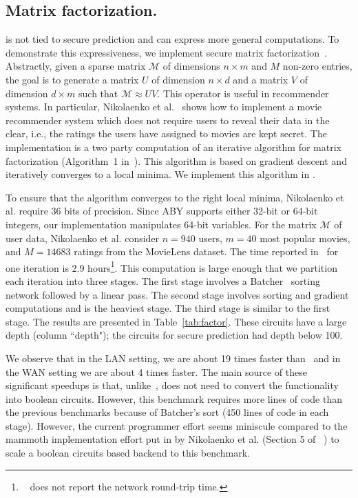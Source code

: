 \subsection{Matrix factorization.}
\tool is not tied to secure prediction and can express more general computations.
To demonstrate this expressiveness, we  implement secure matrix factorization~\cite{valeriaMatrix}. Abstractly, given a sparse matrix $\mathcal{M}$ of dimensions
$n\times m$ and $M$ non-zero entries, the goal is to generate a matrix $U$ of dimension $n\times d$ and a matrix
$V$ of dimension $d\times m$ such that $\mathcal{M}\approx UV$. This operator is useful in recommender systems.
In particular, Nikolaenko et al.~\cite{valeriaMatrix} shows how to implement a movie recommender system which does not require users to reveal their data in the clear, i.e., the ratings the users have assigned to movies are kept secret. The implementation is a two party computation of an iterative algorithm for matrix factorization (Algorithm~1 in~\cite{valeriaMatrix}).
This algorithm is based on gradient descent and iteratively converges to a local minima.
We implement this algorithm in \tool.
  
To ensure that the algorithm converges to the right local minima, Nikolaenko et al. require
36 bits of precision. Since ABY supports either 32-bit or 64-bit integers, our \tool implementation
manipulates 64-bit variables. For the matrix $\mathcal{M}$ of  user data, Nikolaenko et al. consider $n=940$ users, $m=40$ most popular movies, and $M=14683$ ratings from the MovieLens dataset. The time reported in~\cite{valeriaMatrix}
for one iteration is 2.9 hours\footnote{~\cite{valeriaMatrix} does not report the network round-trip time.}. This computation is large enough that we partition each iteration
into three stages. The first stage involves a Batcher~\cite{Batcher} sorting network followed by a linear pass.
The second stage involves sorting and gradient computations and is the heaviest stage.
The third  stage is similar to the first stage. The results are presented in Table~\ref{tab:factor}. These circuits have a large depth (column ``depth"); the circuits for secure prediction had depth below 100.


We observe that in the LAN setting, we are about 19 times faster than~\cite{valeriaMatrix} and in the WAN
setting we are about 4 times faster. The main source of these significant speedups is that, unlike~\cite{valeriaMatrix}, \tool does not need to convert the functionality into boolean circuits. 
However, this benchmark requires more lines of code than the previous benchmarks
because of  Batcher's sort (450 lines of \tool code in each stage).
However, the current programmer effort seems miniscule compared to the mammoth implementation effort
put in by Nikolaenko et al. (Section 5 of ~\cite{valeriaMatrix}) to scale a boolean circuits based
backend to this benchmark.


